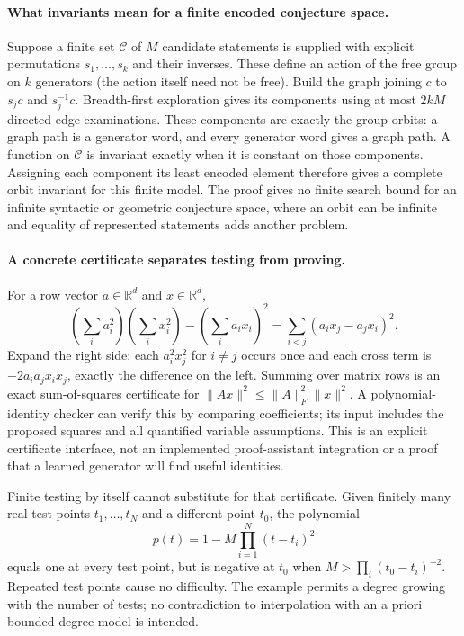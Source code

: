 \documentclass[11pt]{article}
\begin{document}
\paragraph{What invariants mean for a finite encoded conjecture space.}
Suppose a finite set $\mathcal C$ of $M$ candidate statements is supplied with
explicit permutations $s_1,\ldots,s_k$ and their inverses. These define an
action of the free group on $k$ generators (the action itself need not be free).
Build the graph joining $c$ to $s_jc$ and $s_j^{-1}c$.
Breadth-first exploration gives its components using at most $2kM$ directed
edge examinations. These components are exactly the group orbits: a graph path
is a generator word, and every generator word gives a graph path.
A function on $\mathcal C$ is invariant exactly when it is constant on those
components. Assigning each component its least encoded element therefore gives
a complete orbit invariant for this finite model. The proof gives no finite
search bound for an infinite syntactic or geometric conjecture space, where
an orbit can be infinite and equality of represented statements adds another
problem.

\paragraph{A concrete certificate separates testing from proving.}
For a row vector $a\in\mathbb R^d$ and $x\in\mathbb R^d$,
\[
 \left(\sum_i a_i^2\right)\left(\sum_i x_i^2\right)
 -(\sum_i a_ix_i)^2
 =\sum_{i<j}(a_ix_j-a_jx_i)^2.
\]
Expand the right side: each $a_i^2x_j^2$ for $i\ne j$ occurs once and
each cross term is $-2a_ia_jx_ix_j$, exactly the difference on the left.
Summing over matrix rows is an exact sum-of-squares certificate for
$\|Ax\|^2\leq\|A\|_F^2\|x\|^2$.
A polynomial-identity checker can verify this by comparing coefficients; its
input includes the proposed squares and all quantified variable assumptions.
This is an explicit certificate interface, not an implemented proof-assistant
integration or a proof that a learned generator will find useful identities.

Finite testing by itself cannot substitute for that certificate. Given finitely
many real test points $t_1,\ldots,t_N$ and a different point $t_0$, the polynomial
\[
 p(t)=1-M\prod_{i=1}^N(t-t_i)^2
\]
equals one at every test point, but is negative at $t_0$ when
$M>\prod_i(t_0-t_i)^{-2}$. Repeated test points cause no difficulty.
The example permits a degree growing with the number of tests; no contradiction
to interpolation with an a priori bounded-degree model is intended.
\end{document}
